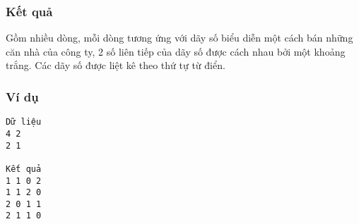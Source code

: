 \subsubsection{   Kết quả  }

   Gồm nhiều dòng, mỗi dòng tương ứng với dãy số biểu diễn một cách bán những căn nhà của công ty, 2 số liên tiếp của dãy số được cách nhau bởi một khoảng trắng. Các dãy số được liệt kê theo thứ tự từ điển.  

\subsubsection{   Ví dụ  }
\begin{verbatim}
Dữ liệu
4 2
2 1

Kết quả
1 1 0 2
1 1 2 0
2 0 1 1
2 1 1 0
\end{verbatim}
